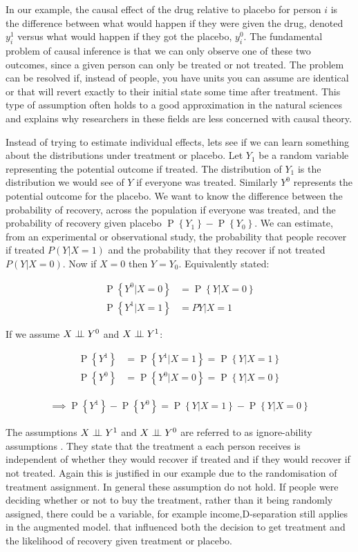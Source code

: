 \documentclass[11pt,a4paper,oneside]{book}
\newcommand{\eq}[1]{\begin{align*}#1\end{align*}}
\renewcommand{\P}[1]{\operatorname{P}\left\{#1\right\}}
\newcommand{\cf}[2]{{#1}_{#2}}
\theoremstyle{plain}
\theoremstyle{definition}
\begin{document}
In our example, the causal effect of the drug relative to placebo for person $i$ is the difference between what would happen if they were given the drug, denoted $y_{i}^{1}$ versus what would happen if they got the placebo, $y_{i}^{0}$. The fundamental problem of causal inference is that we can only observe one of these two outcomes, since a given person can only be treated or not treated. The problem can be resolved if, instead of people, you have units you can assume are identical or that will revert exactly to their initial state some time after treatment. This type of assumption often holds to a good approximation in the natural sciences and explains why researchers in these fields are less concerned with causal theory. 

Instead of trying to estimate individual effects, lets see if we can learn something about the distributions under treatment or placebo.  Let $\cf{Y}{1}$ be a random variable representing the potential outcome if treated. The distribution of $\cf{Y}{1}$ is the distribution we would see of $Y$ if everyone was treated. Similarly $Y^{0}$ represents the potential outcome for the placebo. We want to know the difference between the probability of recovery, across the population if everyone was treated, and the probability of recovery given placebo  $\P{\cf{Y}{1}}-\P{\cf{Y}{0}}$. We can estimate, from an experimental or observational study, the probability that people recover if treated $P(Y|X=1)$ and the probability that they recover if not treated $P(Y|X=0)$. Now if $X=0$ then $Y = \cf{Y}{0}$. Equivalently stated:

\eq{
\P{Y^{0}|X=0}&= \P{Y|X=0}\\
\P{Y^{1}|X=1}&=P{Y|X=1}
}

If we assume $X \perp\!\!\!\perp Y^{0}$ and $X \perp\!\!\!\perp Y^{1}$:

\eq{
\P{Y^{1}} &= \P{Y^{1}|X=1} = \P{Y|X=1} \\
\P{Y^{0}} &= \P{Y^{0}|X=0} = \P{Y|X=0}
}

\eq{
\implies \P{Y^{1}}-\P{Y^{0}} = \P{Y|X=1} - \P{Y|X=0}
}

The assumptions $X \perp\!\!\!\perp Y^{1}$ and $X \perp\!\!\!\perp Y^{0}$  are referred to as ignore-ability assumptions \cite{Rosenbaum1983}. They state that the treatment a each person receives is independent of whether they would recover if treated and if they would recover if not treated. Again this is justified in our example due to the randomisation of treatment assignment. In general these assumption do not hold. If people were deciding whether or not to buy the treatment, rather than it being randomly assigned, there could be a variable, for example income,D-separation still applies in the augmented model. that influenced both the decision to get treatment and the likelihood of recovery given treatment or placebo.
\end{document}
